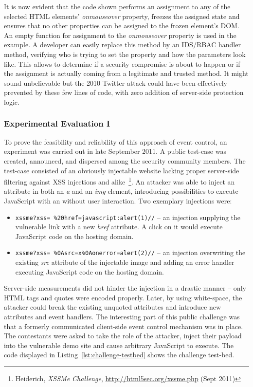       It is now evident that the code shown performs an assignment to any of the selected HTML elements' \textit{onmouseover} property, freezes the assigned state and ensures that no other properties can be assigned to the frozen element's DOM. An empty function for assignment to the \textit{onmouseover} property is used in the example. A developer can easily replace this method by an IDS/RBAC handler method, verifying who is trying to set the property and how the parameters look like. This allows to determine if a security compromise is about to happen or if the assignment is actually coming from a legitimate and trusted method. It might sound unbelievable but the 2010 Twitter attack could have been effectively prevented by these few lines of code, with zero addition of server-side protection logic. \\

      \subsubsection{Experimental Evaluation I}
      \label{subsubsubsec:6.6.4.2_experimental_evaluation}

      To prove the feasibility and reliability of this approach of event control, an experiment was carried out in late September 2011. A public test-case was created, announced, and dispersed among the security community members. The test-case consisted of an obviously injectable website lacking proper server-side filtering against XSS injections and alike~\footnote{Heiderich, \textit{XSSMe Challenge}, \url{http://html5sec.org/xssme.php} (Sept 2011)}. An attacker was able to inject an attribute in both an \textit{a} and an \textit{img} element, introducing possibilities to execute JavaScript with an without user interaction. Two exemplary injections were:

      \begin{itemize}
	\item \texttt{xssme?xss= \%20href=javascript:alert(1)//} -- an injection supplying the vulnerable link with a new \textit{href} attribute. A click on it would execute JavaScript code on the hosting domain.
	\item \texttt{xssme?xss= \%0Asrc=x\%0Aonerror=alert(2)//} -- an injection overwriting the existing \textit{src} attribute of the injectable image and adding an error handler executing JavaScript code on the hosting domain. 
      \end{itemize}

      Server-side measurements did not hinder the injection in a drastic manner -- only HTML tags and quotes were encoded properly. Later, by using white-space, the attacker could break the existing unquoted attributes and introduce new attributes and event handlers. The interesting part of this public challenge was that a formerly communicated client-side event control mechanism was in place. The contestants were asked to take the role of the attacker, inject their payload into the vulnerable demo site and cause arbitrary JavaScript to execute. The code displayed in Listing~\ref{lst:challenge-testbed} shows the challenge test-bed.

